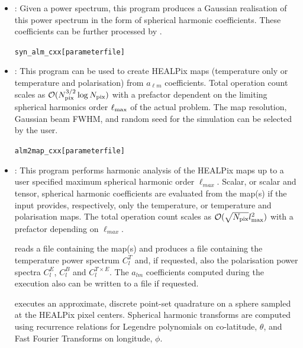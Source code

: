 \begin{itemize}

\item {}:
Given a power spectrum, this program produces a Gaussian realisation of this
power spectrum in the form of spherical harmonic coefficients.
These coefficients can be further processed by .

\begin{alltt}
syn\_alm\_cxx [parameter file]


\end{alltt}

\item {}: This program can be used to create HEALPix
maps (temperature only or temperature and polarisation)
from $a_{\ell m}$ coefficients. Total operation count
scales as ${\cal O}(N_{\rm pix}^{3/2} \log{N_{\rm pix}})$ with a
prefactor dependent on the limiting spherical harmonics order
$\ell_{\rm max}$ of the actual problem.  The map resolution, Gaussian beam
FWHM, and random seed for the simulation can be selected by the user.

\begin{alltt}
alm2map_cxx [parameter file]


\end{alltt}

\item {}: This program performs harmonic analysis of the
HEALPix maps up to a user specified maximum spherical harmonic order
$\ell_{max}$.
Scalar, or scalar and
tensor, spherical harmonic coefficients are evaluated from the map(s)
if the input provides, respectively, only the temperature, or
temperature and polarisation maps.  The total operation count scales
as ${\cal O}(\sqrt{N_{\rm pix}} l_{\rm max}^2)$ with a prefactor
depending on $\ell_{max}$.

 reads a file containing the map(s) and produces a file
containing the temperature power spectrum $C^T_l$ and, if requested,
also the polarisation power spectra $C^E_l$, $C^B_l$ and $C^{T\times
E}_l$.  The $a_{lm}$ coefficients computed during the execution also
can be written to a file if requested.

 executes an approximate, discrete point-set quadrature on a
sphere sampled at the HEALPix pixel centers.  Spherical harmonic
transforms are computed using recurrence relations for Legendre
polynomials on co-latitude, $\theta$, and Fast Fourier Transforms on
longitude, $\phi$.


\end{itemize}
